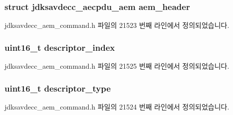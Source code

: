 \subsubsection[{\texorpdfstring{aem\+\_\+header}{aem_header}}]{\setlength{\rightskip}{0pt plus 5cm}struct {\bf jdksavdecc\+\_\+aecpdu\+\_\+aem} aem\+\_\+header}\hypertarget{structjdksavdecc__aem__command__set__matrix_ae1e77ccb75ff5021ad923221eab38294}{}\label{structjdksavdecc__aem__command__set__matrix_ae1e77ccb75ff5021ad923221eab38294}


jdksavdecc\+\_\+aem\+\_\+command.\+h 파일의 21523 번째 라인에서 정의되었습니다.

\subsubsection[{\texorpdfstring{descriptor\+\_\+index}{descriptor_index}}]{\setlength{\rightskip}{0pt plus 5cm}uint16\+\_\+t descriptor\+\_\+index}\hypertarget{structjdksavdecc__aem__command__set__matrix_a042bbc76d835b82d27c1932431ee38d4}{}\label{structjdksavdecc__aem__command__set__matrix_a042bbc76d835b82d27c1932431ee38d4}


jdksavdecc\+\_\+aem\+\_\+command.\+h 파일의 21525 번째 라인에서 정의되었습니다.

\subsubsection[{\texorpdfstring{descriptor\+\_\+type}{descriptor_type}}]{\setlength{\rightskip}{0pt plus 5cm}uint16\+\_\+t descriptor\+\_\+type}\hypertarget{structjdksavdecc__aem__command__set__matrix_ab7c32b6c7131c13d4ea3b7ee2f09b78d}{}\label{structjdksavdecc__aem__command__set__matrix_ab7c32b6c7131c13d4ea3b7ee2f09b78d}


jdksavdecc\+\_\+aem\+\_\+command.\+h 파일의 21524 번째 라인에서 정의되었습니다.

